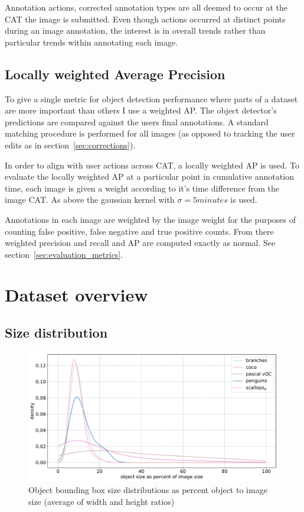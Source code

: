 Annotation actions, corrected annotation types are all deemed to occur at the \gls{CAT} the image is submitted. Even though actions occurred at distinct points during an image annotation, the interest is in overall trends rather than particular trends within annotating each image. 

\subsection {Locally weighted Average Precision}
\label{sec:noisy_trends}

To give a single metric for object detection performance where parts of a dataset are more important than others I use a weighted \gls{AP}. The object detector's predictions are compared against the users final annotations. A standard matching procedure is performed for all images (as opposed to tracking the user edits as in section~\ref{sec:corrections}).

In order to align with user actions across \gls{CAT}, a locally weighted \gls{AP} is used. To evaluate the locally weighted \gls{AP} at a particular point in cumulative annotation time, each image is given a weight according to it's time difference from the image \gls{CAT}. As above the gaussian kernel with $\sigma=5 minutes$ is used.

Annotations in each image are weighted by the image weight for the purposes of counting false positive, false negative and true positive counts. From there weighted precision and recall and \gls{AP} are computed exactly as normal. See section~\ref{sec:evaluation_metrics}.


\section {Dataset overview}
\subsection {Size distribution}

\begin{figure}[ht]
\centering
\includegraphics[width=1.0\linewidth]{charts/summaries/sizes_density.pdf}
\caption{Object bounding box size distributions as percent object to image size (average of width and height ratios) }
\label{fig:box_sizes}
\end{figure}
 

